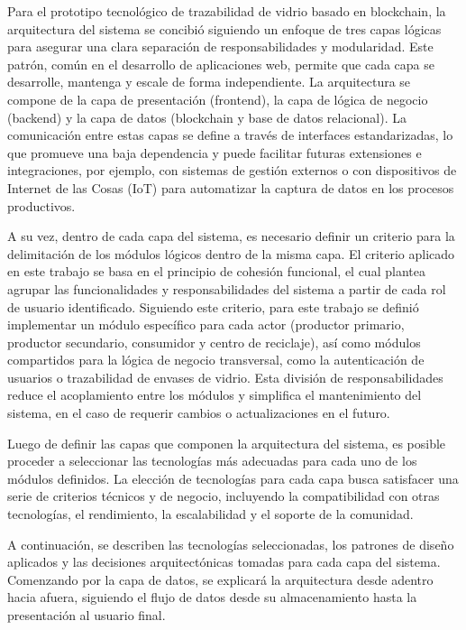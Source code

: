 Para el prototipo tecnológico de trazabilidad de vidrio basado en blockchain, la arquitectura del sistema se concibió siguiendo un enfoque de tres capas lógicas para asegurar una clara separación de responsabilidades y modularidad. Este patrón, común en el desarrollo de aplicaciones web, permite que cada capa se desarrolle, mantenga y escale de forma independiente. La arquitectura se compone de la capa de presentación (frontend), la capa de lógica de negocio (backend) y la capa de datos (blockchain y base de datos relacional). La comunicación entre estas capas se define a través de interfaces estandarizadas, lo que promueve una baja dependencia y puede facilitar futuras extensiones e integraciones, por ejemplo, con sistemas de gestión externos o con dispositivos de Internet de las Cosas (IoT) para automatizar la captura de datos en los procesos productivos.

A su vez, dentro de cada capa del sistema, es necesario definir un criterio para la delimitación de los módulos lógicos dentro de la misma capa. El criterio aplicado en este trabajo se basa en el principio de cohesión funcional, el cual plantea agrupar las funcionalidades y responsabilidades del sistema a partir de cada rol de usuario identificado. Siguiendo este criterio, para este trabajo se definió implementar un módulo específico para cada actor (productor primario, productor secundario, consumidor y centro de reciclaje), así como módulos compartidos para la lógica de negocio transversal, como la autenticación de usuarios o trazabilidad de envases de vidrio. Esta división de responsabilidades reduce el acoplamiento entre los módulos y simplifica el mantenimiento del sistema, en el caso de requerir cambios o actualizaciones en el futuro.

Luego de definir las capas que componen la arquitectura del sistema, es posible proceder a seleccionar las tecnologías más adecuadas para cada uno de los módulos definidos. La elección de tecnologías para cada capa busca satisfacer una serie de criterios técnicos y de negocio, incluyendo la compatibilidad con otras tecnologías, el rendimiento, la escalabilidad y el soporte de la comunidad. 

A continuación, se describen las tecnologías seleccionadas, los patrones de diseño aplicados y las decisiones arquitectónicas tomadas para cada capa del sistema. Comenzando por la capa de datos, se explicará la arquitectura desde adentro hacia afuera, siguiendo el flujo de datos desde su almacenamiento hasta la presentación al usuario final.

